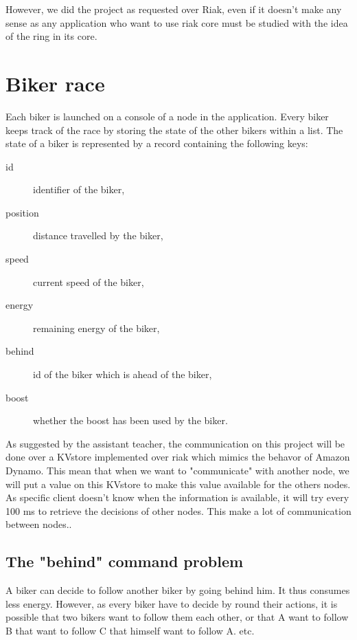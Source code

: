 \documentclass[a4paper, 11pt]{article}
\begin{document}
However, we did the project as requested over Riak, even if it doesn't make any sense as any application who want to use riak core must be studied with the idea of the ring in its core. \\

\section{Biker race}

Each biker is launched on a console of a node in the application.
Every biker keeps track of the race by storing the state of the other bikers within a list.
The state of a biker is represented by a record containing the following keys:
\begin{description}
	\item[id] identifier of the biker,
	\item[position] distance travelled by the biker,
	\item[speed] current speed of the biker,
	\item[energy] remaining energy of the biker,
	\item[behind] id of the biker which is ahead of the biker,
	\item[boost] whether the boost has been used by the biker.
\end{description}

As suggested by the assistant teacher, the communication on this project will be done over a KVstore implemented over riak which mimics the behavor of Amazon Dynamo. This mean that when we want to "communicate" with another node, we will put a value on this KVstore to make this value available for the others nodes. As specific client doesn't know when the information is available, it will try every 100 ms to retrieve the decisions of other nodes. This make a lot of communication between nodes.. \\

\subsection{The "behind" command problem}

A biker can decide to follow another biker by going behind him. It thus consumes less energy. However, as every biker have to decide by round their actions, it is possible that two bikers want to follow them each other, or that A want to follow B that want to follow C that himself want to follow A. etc. \\
\end{document}
